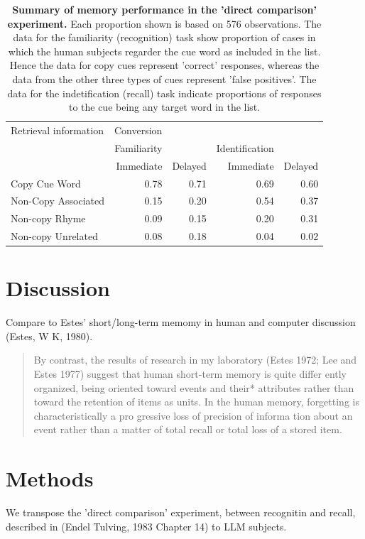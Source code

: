 \documentclass[11pt]{article}
\begin{document}
\begin{table}[htbp]
\caption{\label{tab:org3e795ed}\textbf{Summary of memory performance in the 'direct comparison' experiment.} Each proportion shown is based on 576 observations. The data for the familiarity (recognition) task show proportion of cases in which the human subjects regarder the cue word as included in the list. Hence the data for copy cues represent 'correct' responses, whereas the data from the other three types of cues represent 'false positives'. The data for the indetification (recall) task indicate proportions of responses to the cue being any target word in the list.}
\centering
\begin{tabular}{l|rr|rr}
Retrieval information & Conversion &  &  & \\[0pt]
 & Familiarity &  & Identification & \\[0pt]
 & Immediate & Delayed & Immediate & Delayed\\[0pt]
\hline
Copy Cue Word & 0.78 & 0.71 & 0.69 & 0.60\\[0pt]
Non-Copy Associated & 0.15 & 0.20 & 0.54 & 0.37\\[0pt]
Non-copy Rhyme & 0.09 & 0.15 & 0.20 & 0.31\\[0pt]
Non-copy Unrelated & 0.08 & 0.18 & 0.04 & 0.02\\[0pt]
\end{tabular}
\end{table}




\section*{Discussion}
\label{sec:org0975b3d}

Compare to Estes' short/long-term memomy in human and computer discussion (Estes, W K, 1980).
\begin{quote}
By contrast, the results of research in my laboratory (Estes 1972; Lee and Estes 1977) suggest that human short-term memory is quite differ ently organized, being oriented toward events and their* attributes rather than toward the retention of items as units. In the human memory, forgetting is characteristically a pro gressive loss of precision of informa tion about an event rather than a matter of total recall or total loss of a stored item.
\end{quote}

\section*{Methods}
\label{sec:org07d19e2}
We transpose the 'direct comparison' experiment, between recognitin and recall, described in (Endel Tulving, 1983 Chapter 14) to LLM subjects.
\end{document}
